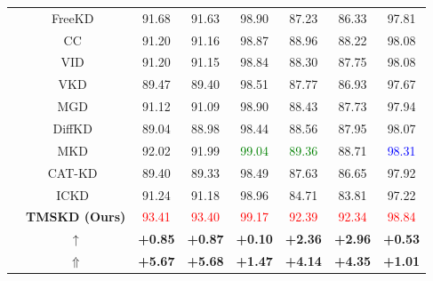\documentclass[a4paper, 12pt]{article}
\begin{document}
\begin{table}[!htbp]
\begin{tabular}{c|c|c|c|c|c|c|c}
& FreeKD~\cite{Zhang2024FreeKD} & 91.68 & 91.63 & 98.90 & 87.23 & 86.33 & 97.81 \\
& CC~\cite{Peng2019CC} & 91.20 & 91.16 & 98.87 & 88.96 & 88.22 & 98.08 \\
& VID~\cite{Ahn2019VID} & 91.20 & 91.15 & 98.84 & 88.30 & 87.75 & 98.08 \\
& VKD~\cite{Miles2024VKD} & 89.47 & 89.40 & 98.51 & 87.77 & 86.93 & 97.67 \\
& MGD~\cite{Yang2022MGD} & 91.12 & 91.09 & 98.90 & 88.43 & 87.73 & 97.94 \\
& DiffKD~\cite{Huang2023DiffKD} & 89.04 & 88.98 & 98.44 & 88.56 & 87.95 & 98.07 \\
& MKD~\cite{Lao2023MKD} & 92.02 & 91.99 & \textcolor{green}{99.04} & \textcolor{green}{89.36} & 88.71 & \textcolor{blue}{98.31} \\
& CAT-KD~\cite{Guo2023CATKD} & 89.40 & 89.33 & 98.49 & 87.63 & 86.65 & 97.92 \\
& ICKD~\cite{Liu2021ICKD} & 91.24 & 91.18 & 98.96 & 84.71 & 83.81 & 97.22 \\
\midrule

\rowcolor{gray!15}
& \textbf{TMSKD (Ours)} &
\textcolor{red}{93.41} &
\textcolor{red}{93.40} &
\textcolor{red}{99.17} &
\textcolor{red}{92.39} &
\textcolor{red}{92.34} &
\textcolor{red}{98.84} \\

& $\uparrow$ & \textbf{+0.85} & \textbf{+0.87} & \textbf{+0.10} & \textbf{+2.36} & \textbf{+2.96} & \textbf{+0.53} \\

& $\Uparrow$ & \textbf{+5.67} & \textbf{+5.68} & \textbf{+1.47} & \textbf{+4.14} & \textbf{+4.35} & \textbf{+1.01} \\
\bottomrule
\end{tabular}
\end{table}

\end{document}
